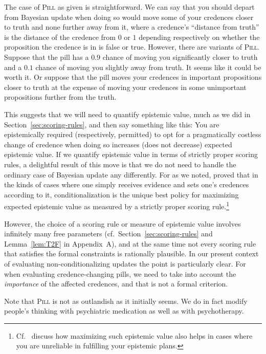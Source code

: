 The case of \textsc{Pill} as given is straightforward. We can say that you should depart from Bayesian update when doing so would move
some of your credences closer to truth and none further away from it, where a credence's ``distance from truth'' is the 
distance of the credence from $0$ or $1$ depending respectively on whether the proposition the credence is in is false or
true. However, there are variants of \textsc{Pill}. Suppose that the pill has a $0.9$ chance of moving you significantly
closer to truth and a $0.1$ chance of moving you slightly away from truth. It seems like it could be worth it. Or suppose
that the pill moves your credences in important propositions closer to truth at the expense of moving your credences in some
unimportant propositions further from the truth.

This suggests that we will need to quantify epistemic value, much as we did in Section~\ref{sec:scoring-rules}, and then say
something like this: You are epistemically required (respectively, permitted) to opt for a pragmatically costless change of 
credence when doing so increases (does not decrease) expected epistemic value. If we quantify epistemic value in terms of
strictly proper scoring rules, a delightful result of this move is that we do not need to handle the ordinary case of 
Bayesian update any differently. For as we noted,  proved that in the kinds of cases where one simply receives
evidence and sets one's credences according to it, conditionalization is the unique best policy for maximizing expected
epistemic value as measured by a strictly proper scoring rule.\footnote{Cf.~ 
discuss how maximizing such epistemic value also helps in cases where you are unreliable in fulfilling your
epistemic plans.}

However, the choice of a scoring rule or measure of epistemic value involves infinitely
many free parameters (cf.\ Section~\ref{sec:scoring-rules} and Lemma~\ref{lem:T2F} in Appendix~A), and at the same time not every scoring rule that satisfies the formal constraints is rationally
plausible. In our present context of evaluating non-conditionalizing updates the point is particularly clear. For when
evaluating credence-changing pills, we need to take into account the \textit{importance} of the affected credences, and
that is not a formal criterion. 

Note that \textsc{Pill} is not as outlandish as it initially seems. We do in fact modify people's thinking with
psychiatric medication as well as with psychotherapy.

